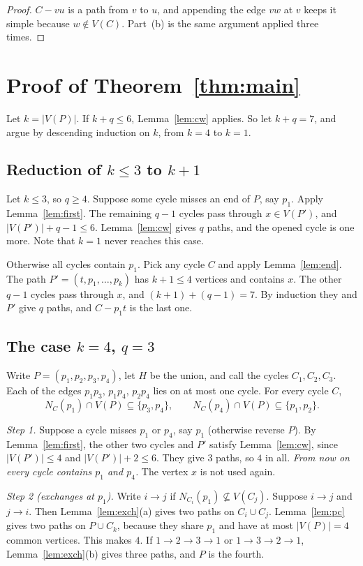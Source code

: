 \documentclass[11pt]{amsart}
\theoremstyle{definition}
\theoremstyle{remark}
\begin{document}
\begin{proof}
$C-vu$ is a path from $v$ to $u$, and appending the edge $vw$ at $v$ keeps it simple because
$w\notin V(C)$. Part~(b) is the same argument applied three times.
\end{proof}

\section{Proof of Theorem~\ref{thm:main}}\label{sec:proof}

Let $k=|V(P)|$. If $k+q\le 6$, Lemma~\ref{lem:cw} applies. So let $k+q=7$, and argue by
descending induction on $k$, from $k=4$ to $k=1$.

\subsection*{Reduction of $k\le 3$ to $k+1$}
Let $k\le 3$, so $q\ge 4$. Suppose some cycle misses an end of $P$, say $p_1$. Apply
Lemma~\ref{lem:first}. The remaining $q-1$ cycles pass through $x\in V(P')$, and
$|V(P')|+q-1\le 6$. Lemma~\ref{lem:cw} gives $q$ paths, and the opened cycle is one more. Note
that $k=1$ never reaches this case.

Otherwise all cycles contain $p_1$. Pick any cycle $C$ and apply Lemma~\ref{lem:end}. The path
$P'=(t,p_1,\dots,p_k)$ has $k+1\le 4$ vertices and contains $x$. The other $q-1$ cycles pass
through $x$, and $(k+1)+(q-1)=7$. By induction they and $P'$ give $q$ paths, and $C-p_1t$ is the
last one.

\subsection*{The case $k=4$, $q=3$}
Write $P=(p_1,p_2,p_3,p_4)$, let $H$ be the union, and call the cycles $C_1,C_2,C_3$. Each of
the edges $p_1p_3$, $p_1p_4$, $p_2p_4$ lies on at most one cycle. For every cycle $C$,
$$N_C(p_1)\cap V(P)\subseteq\{p_3,p_4\},\qquad N_C(p_4)\cap V(P)\subseteq\{p_1,p_2\}.$$

\emph{Step 1.} Suppose a cycle misses $p_1$ or $p_4$, say $p_1$ (otherwise reverse $P$). By
Lemma~\ref{lem:first}, the other two cycles and $P'$ satisfy Lemma~\ref{lem:cw}, since
$|V(P')|\le 4$ and $|V(P')|+2\le 6$. They give $3$ paths, so $4$ in all. \emph{From now on every
cycle contains $p_1$ and $p_4$.} The vertex $x$ is not used again.

\emph{Step 2 (exchanges at $p_1$).} Write $i\to j$ if $N_{C_i}(p_1)\not\subseteq V(C_j)$. Suppose
$i\to j$ and $j\to i$. Then Lemma~\ref{lem:exch}(a) gives two paths on $C_i\cup C_j$.
Lemma~\ref{lem:pc} gives two paths on $P\cup C_k$, because they share $p_1$ and have at most
$|V(P)|=4$ common vertices. This makes $4$. If $1\to2\to3\to1$ or $1\to3\to2\to1$,
Lemma~\ref{lem:exch}(b) gives three paths, and $P$ is the fourth.
\end{document}
